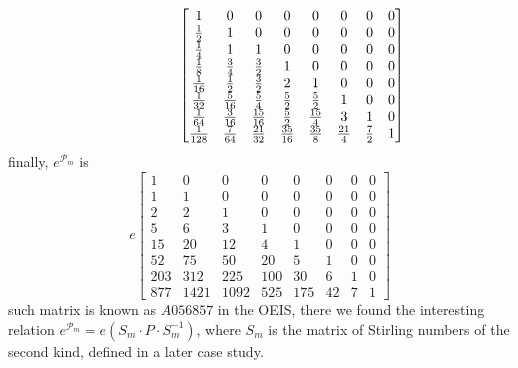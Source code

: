 \begin{displaymath}
\indent\indent\indent \left[\begin{matrix}1 & 0 & 0 & 0 & 0 & 0 & 0 & 0\\\frac{1}{2} & 1 & 0 & 0 & 0 & 0 & 0 & 0\\\frac{1}{4} & 1 & 1 & 0 & 0 & 0 & 0 & 0\\\frac{1}{8} & \frac{3}{4} & \frac{3}{2} & 1 & 0 & 0 & 0 & 0\\\frac{1}{16} & \frac{1}{2} & \frac{3}{2} & 2 & 1 & 0 & 0 & 0\\\frac{1}{32} & \frac{5}{16} & \frac{5}{4} & \frac{5}{2} & \frac{5}{2} & 1 & 0 & 0\\\frac{1}{64} & \frac{3}{16} & \frac{15}{16} & \frac{5}{2} & \frac{15}{4} & 3 & 1 & 0\\\frac{1}{128} & \frac{7}{64} & \frac{21}{32} & \frac{35}{16} & \frac{35}{8} & \frac{21}{4} & \frac{7}{2} & 1\end{matrix}\right]
\end{displaymath}
finally, $e^{\mathcal{P}_{m}}$ is
\begin{displaymath}
e \left[\begin{matrix}1 & 0 & 0 & 0 & 0 & 0 & 0 & 0\\1 & 1 & 0 & 0 & 0 & 0 & 0 & 0\\2 & 2 & 1 & 0 & 0 & 0 & 0 & 0\\5 & 6 & 3 & 1 & 0 & 0 & 0 & 0\\15 & 20 & 12 & 4 & 1 & 0 & 0 & 0\\52 & 75 & 50 & 20 & 5 & 1 & 0 & 0\\203 & 312 & 225 & 100 & 30 & 6 & 1 & 0\\877 & 1421 & 1092 & 525 & 175 & 42 & 7 & 1\end{matrix}\right]
\end{displaymath}
such matrix is known as $A056857$ in the OEIS, there we found
the interesting relation $e^{\mathcal{P}_{m}}=e\left(S_{m}\cdot P\cdot S_{m}^{-1}\right)$,
where $S_{m}$ is the matrix of Stirling numbers of the second kind, defined in a later case study.

